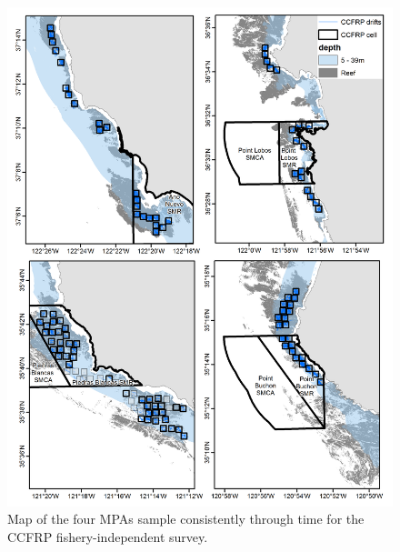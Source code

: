 \documentclass[12pt,]{article}
\begin{document}
\begin{figure}
\centering
\includegraphics{Figures/CCFRP_sites.png}
\caption{Map of the four MPAs sample consistently through time for the
CCFRP fishery-independent survey. \label{fig:CCFRP_sites}}
\end{figure}

\FloatBarrier
\end{document}
